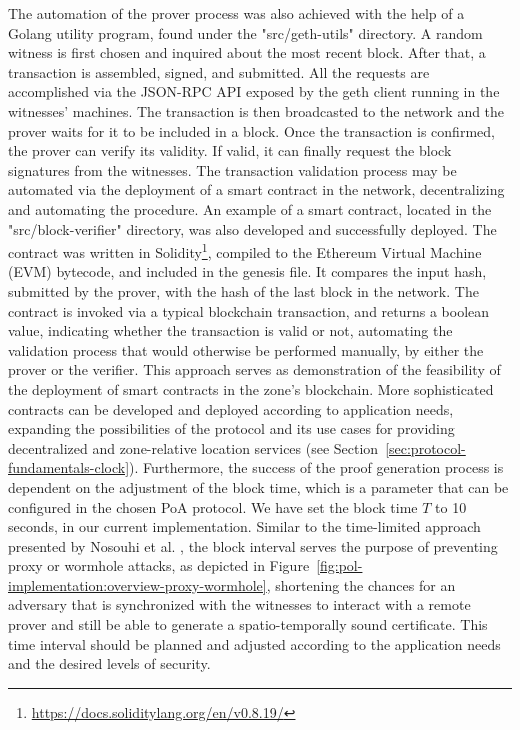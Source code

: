 The automation of the prover process was also achieved with the help of a Golang utility program, found under the "src/geth-utils" directory. A random witness is first chosen and inquired about the most recent block. After that, a transaction is assembled, signed, and submitted. All the requests are accomplished via the JSON-RPC API exposed by the geth client running in the witnesses' machines. The transaction is then broadcasted to the network and the prover waits for it to be included in a block. Once the transaction is confirmed, the prover can verify its validity. If valid, it can finally request the block signatures from the witnesses. The transaction validation process may be automated via the deployment of a smart contract in the network, decentralizing and automating the procedure. An example of a smart contract, located in the "src/block-verifier" directory, was also developed and successfully deployed. The contract was written in Solidity\footnote{\url{https://docs.soliditylang.org/en/v0.8.19/}}, compiled to the Ethereum Virtual Machine (EVM) bytecode, and included in the genesis file. It compares the input hash, submitted by the prover, with the hash of the last block in the network. The contract is invoked via a typical blockchain transaction, and returns a boolean value, indicating whether the transaction is valid or not, automating the validation process that would otherwise be performed manually, by either the prover or the verifier. This approach serves as demonstration of the feasibility of the deployment of smart contracts in the zone's blockchain. More sophisticated contracts can be developed and deployed according to application needs, expanding the possibilities of the protocol and its use cases for providing decentralized and zone-relative location services (see Section~\ref{sec:protocol-fundamentals-clock}). Furthermore, the success of the proof generation process is dependent on the adjustment of the block time, which is a parameter that can be configured in the chosen PoA protocol. We have set the block time $T$ to 10 seconds, in our current implementation. Similar to the time-limited approach presented by Nosouhi et al. \cite{nosouhi2020blockchain}, the block interval serves the purpose of preventing proxy or wormhole attacks, as depicted in Figure~\ref{fig:pol-implementation:overview-proxy-wormhole}, shortening the chances for an adversary that is synchronized with the witnesses to interact with a remote prover and still be able to generate a spatio-temporally sound \pol{} certificate. This time interval should be planned and adjusted according to the application needs and the desired levels of security.

